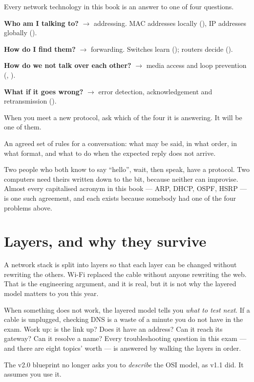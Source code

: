 \begin{conceptbox}
Every network technology in this book is an answer to one of four questions.
\begin{tight}
  \item \textbf{Who am I talking to?} $\rightarrow$ addressing. MAC addresses
        locally (), IP addresses globally ().
  \item \textbf{How do I find them?} $\rightarrow$ forwarding. Switches learn
        (); routers decide ().
  \item \textbf{How do we not talk over each other?} $\rightarrow$ media access
        and loop prevention (, ).
  \item \textbf{What if it goes wrong?} $\rightarrow$ error detection,
        acknowledgement and retransmission ().
\end{tight}
When you meet a new protocol, ask which of the four it is answering. It will be
one of them.
\end{conceptbox}

\begin{definitionbox}[Protocol]
An agreed set of rules for a conversation: what may be said, in what order, in
what format, and what to do when the expected reply does not arrive.

Two people who both know to say ``hello'', wait, then speak, have a protocol.
Two computers need theirs written down to the bit, because neither can improvise.
Almost every capitalised acronym in this book --- ARP, DHCP, OSPF, HSRP --- is one
such agreement, and each exists because somebody had one of the four problems
above.
\end{definitionbox}

\section{Layers, and why they survive}

A network stack is split into layers so that each layer can be changed without
rewriting the others. Wi-Fi replaced the cable without anyone rewriting the web.
That is the engineering argument, and it is real, but it is not why the layered
model matters to you this year.

\begin{conceptbox}
When something does not work, the layered model tells you \emph{what to test
next}. If a cable is unplugged, checking DNS is a waste of a minute you do not
have in the exam. Work up: is the link up? Does it have an address? Can it reach
its gateway? Can it resolve a name? Every troubleshooting question in this exam
--- and there are eight topics' worth --- is answered by walking the layers in
order.

The v2.0 blueprint no longer asks you to \emph{describe} the OSI model, as v1.1
did. It assumes you use it.
\end{conceptbox}

